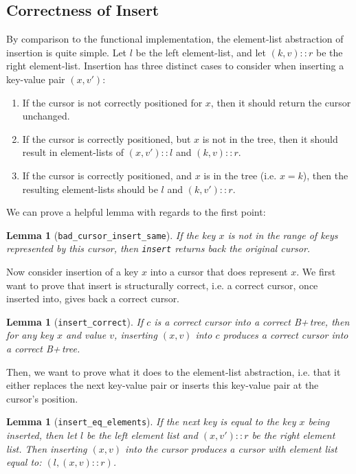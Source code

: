 \documentclass[12pt]{article}
\newtheorem{lemma}[theorem]{Lemma}
\begin{document}
\subsection{Correctness of Insert}

By comparison to the functional implementation, the element-list abstraction of insertion is quite simple. Let $l$ be the left element-list, and let $(k,v)::r$ be the right element-list. Insertion has three distinct cases to consider when inserting a key-value pair $(x,v')$:
\begin{enumerate}
    \item If the cursor is not correctly positioned for $x$, then it should return the cursor unchanged.
    \item If the cursor is correctly positioned, but $x$ is not in the tree, then it should result in element-lists of $(x,v')::l$ and $(k,v)::r$.
    \item If the cursor is correctly positioned, and $x$ is in the tree (i.e. $x = k$), then the resulting element-lists should be $l$ and $(k,v')::r$.
\end{enumerate}

We can prove a helpful lemma with regards to the first point:

\begin{lemma}[\texttt{bad\_cursor\_insert\_same}]
If the key $x$ is not in the range of keys represented by this cursor, then \texttt{insert} returns back the original cursor.
\end{lemma}

Now consider insertion of a key $x$ into a cursor that does represent $x$. We first want to prove that insert is structurally correct, i.e. a correct cursor, once inserted into, gives back a correct cursor.

\begin{lemma}[\texttt{insert\_correct}]
\label{lemma:insert_correct}
If $c$ is a correct cursor into a correct B+\,tree, then for any key $x$ and value $v$, inserting $(x,v)$ into $c$ produces a correct cursor into a correct B+\,tree.
\end{lemma}

Then, we want to prove what it does to the element-list abstraction, i.e. that it either replaces the next key-value pair or inserts this key-value pair at the cursor's position.

\begin{lemma}[\texttt{insert\_eq\_elements}]
If the next key is equal to the key $x$ being inserted, then let $l$ be the left element list and $(x,v')::r$ be the right element list. Then inserting $(x,v)$ into the cursor produces a cursor with element list equal to: $(l,(x,v)::r)$.
\end{lemma}
\end{document}
